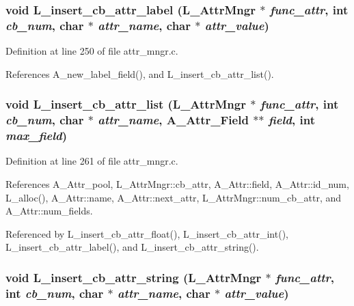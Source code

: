 \subsubsection{\setlength{\rightskip}{0pt plus 5cm}void L\_\-insert\_\-cb\_\-attr\_\-label (\bf{L\_\-Attr\-Mngr} $\ast$ {\em func\_\-attr}, int {\em cb\_\-num}, char $\ast$ {\em attr\_\-name}, char $\ast$ {\em attr\_\-value})}\label{attr__mngr_8h_2bd642fd3a1750bc0f86173a744cac9a}




Definition at line 250 of file attr\_\-mngr.c.

References A\_\-new\_\-label\_\-field(), and L\_\-insert\_\-cb\_\-attr\_\-list().
\subsubsection{\setlength{\rightskip}{0pt plus 5cm}void L\_\-insert\_\-cb\_\-attr\_\-list (\bf{L\_\-Attr\-Mngr} $\ast$ {\em func\_\-attr}, int {\em cb\_\-num}, char $\ast$ {\em attr\_\-name}, \bf{A\_\-Attr\_\-Field} $\ast$$\ast$ {\em field}, int {\em max\_\-field})}\label{attr__mngr_8h_d1d69cb2730317f0eb24bb1b367f855e}




Definition at line 261 of file attr\_\-mngr.c.

References A\_\-Attr\_\-pool, L\_\-Attr\-Mngr::cb\_\-attr, A\_\-Attr::field, A\_\-Attr::id\_\-num, L\_\-alloc(), A\_\-Attr::name, A\_\-Attr::next\_\-attr, L\_\-Attr\-Mngr::num\_\-cb\_\-attr, and A\_\-Attr::num\_\-fields.

Referenced by L\_\-insert\_\-cb\_\-attr\_\-float(), L\_\-insert\_\-cb\_\-attr\_\-int(), L\_\-insert\_\-cb\_\-attr\_\-label(), and L\_\-insert\_\-cb\_\-attr\_\-string().
\subsubsection{\setlength{\rightskip}{0pt plus 5cm}void L\_\-insert\_\-cb\_\-attr\_\-string (\bf{L\_\-Attr\-Mngr} $\ast$ {\em func\_\-attr}, int {\em cb\_\-num}, char $\ast$ {\em attr\_\-name}, char $\ast$ {\em attr\_\-value})}\label{attr__mngr_8h_770602f2a2b0ade8b2b46895042b62e8}




